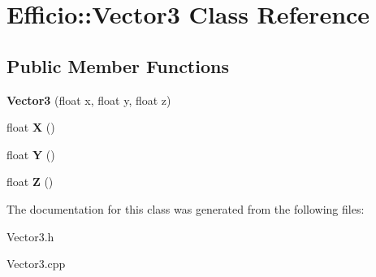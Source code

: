 \hypertarget{class_efficio_1_1_vector3}{}\section{Efficio\+:\+:Vector3 Class Reference}
\label{class_efficio_1_1_vector3}
\subsection*{Public Member Functions}
\begin{DoxyCompactItemize}
\item 
\hypertarget{class_efficio_1_1_vector3_a25ddecf52b20f83dad77f70f5fe856d7}{}\label{class_efficio_1_1_vector3_a25ddecf52b20f83dad77f70f5fe856d7} 
{\bfseries Vector3} (float x, float y, float z)
\item 
\hypertarget{class_efficio_1_1_vector3_a64c3100486b0bb40756a2ab871ec571a}{}\label{class_efficio_1_1_vector3_a64c3100486b0bb40756a2ab871ec571a} 
float {\bfseries X} ()
\item 
\hypertarget{class_efficio_1_1_vector3_a2a49ce0090a5505d92c6cefa84afab5e}{}\label{class_efficio_1_1_vector3_a2a49ce0090a5505d92c6cefa84afab5e} 
float {\bfseries Y} ()
\item 
\hypertarget{class_efficio_1_1_vector3_ab2befc75a1b0c356ac23dd2ae9ef7041}{}\label{class_efficio_1_1_vector3_ab2befc75a1b0c356ac23dd2ae9ef7041} 
float {\bfseries Z} ()
\end{DoxyCompactItemize}


The documentation for this class was generated from the following files\+:\begin{DoxyCompactItemize}
\item 
Vector3.\+h\item 
Vector3.\+cpp\end{DoxyCompactItemize}

